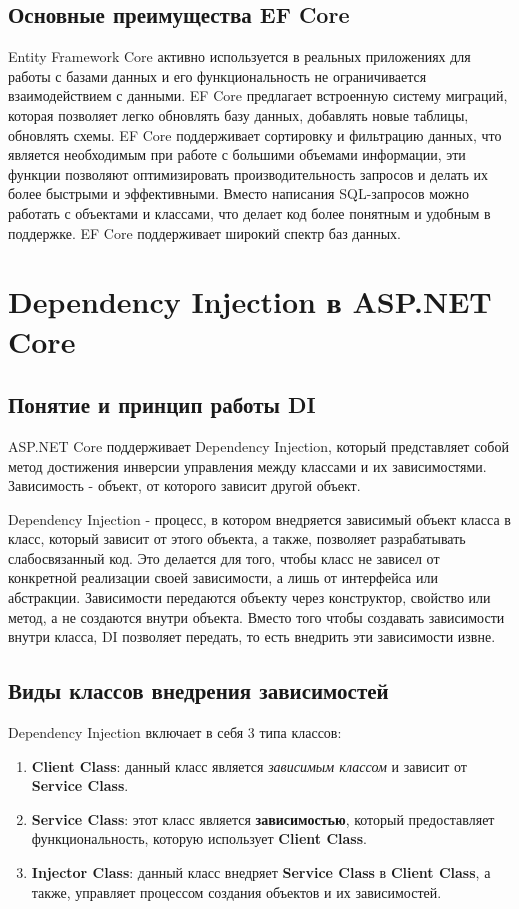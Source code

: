 \documentclass[a4paper,12pt]{report}
\begin{document}
\subsection{Основные преимущества \acs{EF} Core}

Entity Framework Core активно используется в реальных приложениях для работы с базами данных и его функциональность 
не ограничивается взаимодействием с данными. \acs{EF} Core предлагает встроенную систему миграций, которая позволяет легко 
обновлять базу данных, добавлять новые таблицы, обновлять схемы. \acs{EF} Core поддерживает сортировку и фильтрацию данных, 
что является необходимым при работе с большими объемами информации, эти функции позволяют оптимизировать производительность 
запросов и делать их более быстрыми и эффективными. Вместо написания \acs{SQL}-запросов можно работать с объектами и классами, 
что делает код более понятным и удобным в поддержке. \acs{EF} Core поддерживает широкий спектр баз данных.

\section{Dependency Injection в ASP.NET Core}

\subsection{Понятие и принцип работы \acs{DI}}

ASP.NET Core поддерживает Dependency Injection, который представляет собой метод достижения инверсии управления 
между классами и их зависимостями. Зависимость - объект, от которого зависит другой объект.

Dependency Injection - процесс, в котором внедряется зависимый объект класса в класс, который зависит от этого объекта, 
а также, позволяет разрабатывать слабосвязанный код. Это делается для того, чтобы класс не зависел от конкретной реализации своей зависимости, 
а лишь от интерфейса или абстракции. Зависимости передаются объекту через конструктор, свойство или метод, а не создаются внутри объекта. 
Вместо того чтобы создавать зависимости внутри класса, \acs{DI} позволяет передать, то есть внедрить эти зависимости извне. 

\subsection{Виды классов внедрения зависимостей}

Dependency Injection включает в себя 3 типа классов:
\begin{enumerate}
    \item
        \textbf{Client Class}: данный класс является \textit{зависимым классом} и зависит от \textbf{Service Class}.
    \item
        \textbf{Service Class}: этот класс является \textbf{зависимостью}, который предоставляет функциональность, которую использует \textbf{Client Class}.
    \item
        \textbf{Injector Class}: данный класс внедряет \textbf{Service Class} в \textbf{Client Class}, а также, управляет процессом создания объектов и их зависимостей.
\end{enumerate}
\end{document}
